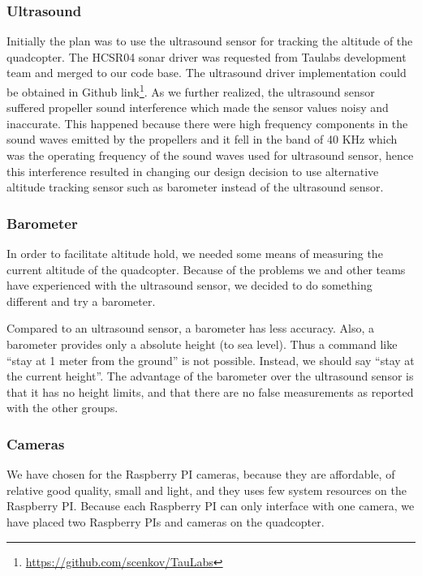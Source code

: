 \documentclass[11pt, a4paper, onecolumn, oneside, parskip=half]{scrartcl}
\begin{document}
\subsubsection{Ultrasound}
\label{sec:arch:sensors:ultrasound}
Initially the plan was to use the ultrasound sensor for tracking the altitude of the quadcopter. The HCSR04 sonar driver was requested from Taulabs development team and merged to our code base. The ultrasound driver implementation could be obtained in Github link\footnote{\url{https://github.com/scenkov/TauLabs}}. As we further realized, the ultrasound sensor suffered propeller sound interference which made the sensor values noisy and inaccurate. This happened because there were high frequency components in the sound waves emitted by the propellers and it fell in the band of 40 KHz which was the operating frequency of the sound waves used for ultrasound sensor, hence this interference resulted in changing our design decision to use alternative altitude tracking sensor such as barometer instead of the ultrasound sensor.

\subsubsection{Barometer}
\label{sec:arch:sensors:batometer}
In order to facilitate altitude hold, we needed some means of measuring the current altitude of the quadcopter. Because of the problems we and other teams have experienced with the ultrasound sensor, we decided to do something different and try a barometer.

Compared to an ultrasound sensor, a barometer has less accuracy. Also, a barometer provides only a absolute height (to sea level). Thus a command like ``stay at 1 meter from the ground'' is not possible. Instead, we should say ``stay at the current height''. The advantage of the barometer over the ultrasound sensor is that it has no height limits, and that there are no false measurements as reported with the other groups.

\subsubsection{Cameras}
\label{sec:arch:sensors:cameras}
We have chosen for the Raspberry PI cameras, because they are affordable, of relative good quality, small and light, and they uses few system resources on the Raspberry PI. Because each Raspberry PI can only interface with one camera, we have placed two Raspberry PIs and cameras on the quadcopter.
\end{document}
